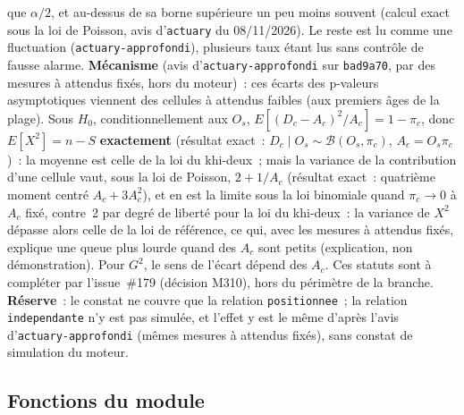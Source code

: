 \documentclass[a4paper,11pt]{article}
\newcommand{\code}[1]{\texttt{\small #1}}
\begin{document}
que $\alpha/2$, et au-dessus de sa borne supérieure un peu moins souvent
(calcul exact sous la loi de Poisson, avis d'\code{actuary} du
08/11/2026). Le reste est lu comme une fluctuation
(\code{actuary-approfondi}), plusieurs taux étant lus sans contrôle de
fausse alarme.
\textbf{Mécanisme} (avis d'\code{actuary-approfondi} sur \code{bad9a70},
par des mesures à attendus fixés, hors du moteur)~: ces écarts des
p-valeurs asymptotiques viennent des cellules à attendus faibles (aux
premiers âges de la plage). Sous $H_0$, conditionnellement aux $O_s$,
$E[(D_c - A_c)^2 / A_c] = 1 - \pi_c$, donc $E[X^2] = n - S$
\textbf{exactement} (résultat exact~: $D_c \mid O_s \sim
\mathcal{B}(O_s, \pi_c)$, $A_c = O_s \pi_c$)~: la moyenne est celle de la
loi du khi-deux~; mais la variance de la contribution d'une cellule vaut,
sous la loi de Poisson, $2 + 1/A_c$ (résultat exact~: quatrième moment
centré $A_c + 3A_c^2$), et en est la limite sous la loi binomiale quand
$\pi_c \to 0$ à $A_c$ fixé, contre~2 par degré de liberté pour la loi du
khi-deux~: la variance de $X^2$ dépasse alors celle de la loi de
référence, ce qui, avec les mesures à attendus fixés, explique une queue
plus lourde quand des $A_c$ sont petits (explication, non démonstration). Pour $G^2$, le sens de l'écart
dépend des $A_c$. Ces statuts sont à compléter par l'issue~\#179
(décision M310), hors du périmètre de la branche. \textbf{Réserve}~: le
constat ne couvre que la relation \code{positionnee}~; la relation
\code{independante} n'y est pas simulée, et l'effet y est le même d'après
l'avis d'\code{actuary-approfondi} (mêmes mesures à attendus fixés), sans
constat de simulation du moteur.

\subsection{Fonctions du module}
\label{sec:fonctions-positionnement}
\end{document}

